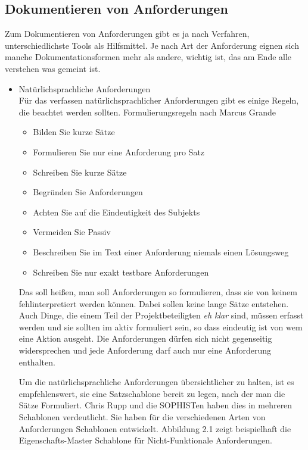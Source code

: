 \subsection{Dokumentieren von Anforderungen}

Zum Dokumentieren von Anforderungen gibt es ja nach Verfahren, unterschiedlichste Tools als Hilfsmittel.
Je nach Art der Anforderung eignen sich manche Dokumentationsformen mehr als andere, wichtig ist, das am Ende alle verstehen was gemeint ist. 
\begin{itemize}
\item Natürlichsprachliche Anforderungen\\
Für das verfassen natürlichsprachlicher Anforderungen gibt es einige Regeln, die beachtet werden sollten.
Formulierungsregeln nach Marcus Grande\autocite[71]{100minAM}
	\begin{itemize}
	\itemsep-8pt
	\item Bilden Sie kurze Sätze
	\item Formulieren Sie nur eine Anforderung pro Satz
	\item Schreiben Sie kurze Sätze
	\item Begründen Sie Anforderungen
	\item Achten Sie auf die Eindeutigkeit des Subjekts
	\item Vermeiden Sie Passiv
	\item Beschreiben Sie im Text einer Anforderung niemals einen Lösungsweg
	\item Schreiben Sie nur exakt testbare Anforderungen
	\end{itemize}

Das soll heißen, man soll Anforderungen so formulieren, dass sie von keinem fehlinterpretiert werden können. Dabei sollen keine lange Sätze entstehen. Auch Dinge, die einem Teil der Projektbeteiligten \textit{eh klar} sind, müssen erfasst werden und sie sollten im aktiv formuliert sein, so dass eindeutig ist von wem eine Aktion ausgeht. Die Anforderungen dürfen sich nicht gegenseitig widersprechen und jede Anforderung darf auch nur eine Anforderung enthalten.

Um die natürlichsprachliche Anforderungen übersichtlicher zu halten, ist es empfehlenswert, sie eine Satzschablone bereit zu legen, nach der man die Sätze Formuliert. Chris Rupp und die SOPHISTen haben dies in mehreren Schablonen verdeutlicht. Sie haben für die verschiedenen Arten von Anforderungen Schablonen entwickelt. Abbildung 2.1 zeigt beispielhaft die Eigenschafts-Master Schablone für Nicht-Funktionale Anforderungen.
\begin{center}
\begin{minipage}{\linewidth}
	\centering


\end{minipage}
\end{center}
\end{itemize}
